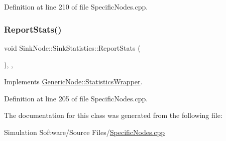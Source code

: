 Definition at line 210 of file Specific\+Nodes.\+cpp.

\mbox{\label{class_sink_node_1_1_sink_statistics_a2b8337521bc63a06000571aaede60ad9}} 
\subsubsection{\texorpdfstring{Report\+Stats()}{ReportStats()}}
{\footnotesize\ttfamily void Sink\+Node\+::\+Sink\+Statistics\+::\+Report\+Stats (\begin{DoxyParamCaption}{ }\end{DoxyParamCaption})\hspace{0.3cm}{\ttfamily [inline]}, {\ttfamily [override]}, {\ttfamily [virtual]}}



Implements \hyperlink{class_generic_node_1_1_statistics_wrapper_a280ae59c2d5f64be5848335dc1b77c21}{Generic\+Node\+::\+Statistics\+Wrapper}.



Definition at line 205 of file Specific\+Nodes.\+cpp.



The documentation for this class was generated from the following file\+:\begin{DoxyCompactItemize}
\item 
Simulation Software/\+Source Files/\hyperlink{_specific_nodes_8cpp}{Specific\+Nodes.\+cpp}\end{DoxyCompactItemize}

